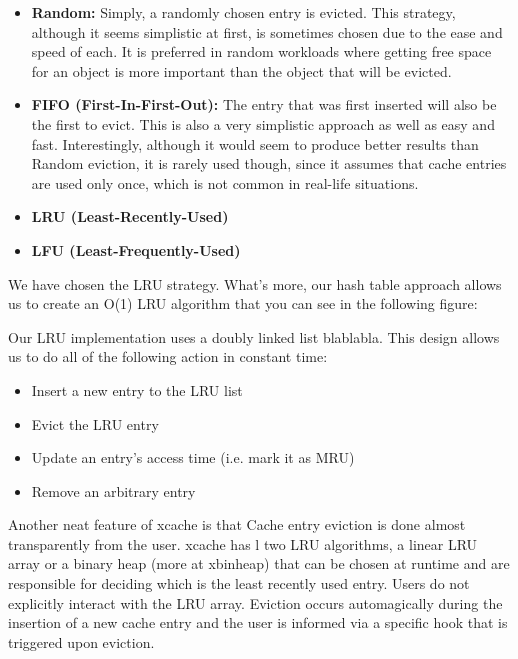 %
\begin{itemize}
	\item \textbf{Random:} Simply, a randomly chosen entry is evicted. This 
		strategy, although it seems simplistic at first, is sometimes chosen 
		due to the ease and speed of each. It is preferred in random workloads 
		where getting free space for an object is more important than the 
		object that will be evicted.
	\item \textbf{FIFO (First-In-First-Out):} The entry that was first inserted 
		will also be the first to evict. This is also a very simplistic 
		approach as well as easy and fast. Interestingly, although it would 
		seem to produce better results than Random eviction, it is rarely used 
		though, since it assumes that cache entries are used only once, which 
		is not common in real-life situations.
	\item \textbf{LRU (Least-Recently-Used)}
	\item \textbf{LFU (Least-Frequently-Used)}
\end{itemize}

We have chosen the LRU strategy. What's more, our hash table approach allows us 
to create an O(1) LRU algorithm that you can see in the following figure:


Our LRU implementation uses a doubly linked list blablabla.
This design allows us to do all of the following action in constant time:

\begin{itemize}
	\item Insert a new entry to the LRU list
	\item Evict the LRU entry
	\item Update an entry's access time (i.e. mark it as MRU)
	\item Remove an arbitrary entry
\end{itemize}

Another neat feature of xcache is that Cache entry eviction is done almost 
transparently from the user.  xcache has l
two
LRU algorithms, a linear LRU array or a binary heap (more at xbinheap) that can
be chosen at runtime and are responsible for deciding which is the least
recently used entry. Users do not explicitly interact with the LRU array.
Eviction occurs automagically during the insertion of a new cache entry and the
user is informed via a specific hook that is triggered upon eviction.

